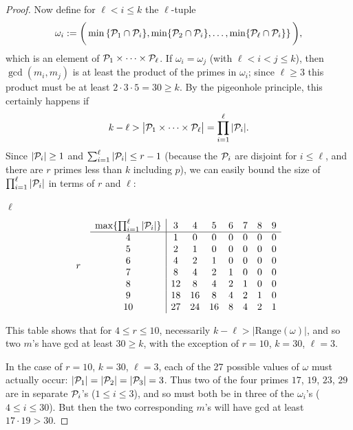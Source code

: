 \documentclass[12pt]{article}
\begin{document}
\begin{proof}
Now define for $\ell<i\le k$ the $\ell$-tuple
    \[
    \omega_i := \bigg( \min\left\{ {\cal P}_1 \cap {\cal P}_i\},\min\{{\cal P}_2 \cap {\cal P}_i\}, \dots,
                        \min\{{\cal P}_\ell \cap {\cal P}_i\}\right\} \bigg),
    \]
which is an element of ${\cal P}_1 \times \cdots \times {\cal P}_\ell$. If $\omega_i=\omega_j$ (with $\ell < i
<j\le k$), then $\gcd(m_i,m_j)$ is at least the product of the primes in $\omega_i$; since $\ell\ge 3$ this
product must be at least $2\cdot 3\cdot 5=30\ge k$. By the pigeonhole principle, this certainly happens if
    \[
    k-\ell> \big|{\cal P}_1 \times \cdots \times {\cal P}_\ell\big| = \prod_{i=1}^\ell |{\cal P}_i|.
    \]
Since $|{\cal P}_i|\ge 1$ and $\sum_{i=1}^\ell |{\cal P}_i| \le r-1$ (because the ${\cal P}_i$ are disjoint for
$i\le \ell$, and there are $r$ primes less than $k$ including $p$), we can easily bound the size of
$\prod_{i=1}^\ell |{\cal P}_i|$ in terms of $r$ and $\ell$:
    \begin{center}
    \hspace{6.6cm} $\ell$ \newline
    \[ r\quad
    \begin{array}{c|cccccccc}
    \max\{\prod_{i=1}^\ell |{\cal P}_i|\} & 3 & 4 & 5 & 6 & 7 & 8 & 9 \\ \hline
    4 & 1 & 0& 0& 0& 0& 0& 0\\
    5 & 2 & 1 & 0& 0& 0& 0& 0 \\
    6 & 4 & 2 & 1 & 0& 0& 0& 0\\
    7 & 8 & 4 & 2 & 1 & 0& 0& 0 \\
    8 & 12 & 8 & 4 & 2 & 1 & 0 & 0 \\
    9 & 18 & 16 & 8 & 4 & 2 & 1 & 0 \\
    10 & 27 & 24 & 16 & 8 & 4 & 2 & 1
    \end{array}
    \]
    \end{center}
This table shows that for $4\le r\le 10$, necessarily $k-\ell>|\text{Range}(\omega)|$, and so two $m$'s have gcd
at least $30\ge k$, with the exception of $r=10$, $k=30$, $\ell=3$.

In the case of $r=10$, $k=30$, $\ell=3$, each of the 27 possible values of $\omega$ must actually occur: $|{\cal
P}_1|=|{\cal P}_2|=|{\cal P}_3| =3$. Thus two of the four primes $17$, $19$, $23$, $29$ are in separate ${\cal
P}_i$'s ($1\le i \le 3$), and so must both be in three of the $\omega_i$'s ($4\le i \le 30$). But then the two
corresponding $m$'s will have gcd at least $17\cdot 19>30$.
\end{proof}
\end{document}
